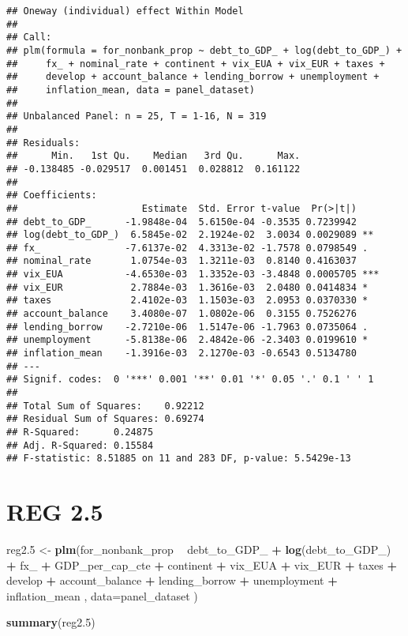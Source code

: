 \documentclass[]{article}
\newenvironment{Shaded}{\begin{snugshade}}{\end{snugshade}}
\newcommand{\KeywordTok}[1]{\textcolor[rgb]{0.13,0.29,0.53}{\textbf{#1}}}
\newcommand{\DataTypeTok}[1]{\textcolor[rgb]{0.13,0.29,0.53}{#1}}
\newcommand{\DecValTok}[1]{\textcolor[rgb]{0.00,0.00,0.81}{#1}}
\newcommand{\StringTok}[1]{\textcolor[rgb]{0.31,0.60,0.02}{#1}}
\newcommand{\OperatorTok}[1]{\textcolor[rgb]{0.81,0.36,0.00}{\textbf{#1}}}
\newcommand{\NormalTok}[1]{#1}
\begin{document}
\begin{verbatim}
## Oneway (individual) effect Within Model
## 
## Call:
## plm(formula = for_nonbank_prop ~ debt_to_GDP_ + log(debt_to_GDP_) + 
##     fx_ + nominal_rate + continent + vix_EUA + vix_EUR + taxes + 
##     develop + account_balance + lending_borrow + unemployment + 
##     inflation_mean, data = panel_dataset)
## 
## Unbalanced Panel: n = 25, T = 1-16, N = 319
## 
## Residuals:
##      Min.   1st Qu.    Median   3rd Qu.      Max. 
## -0.138485 -0.029517  0.001451  0.028812  0.161122 
## 
## Coefficients:
##                      Estimate  Std. Error t-value  Pr(>|t|)    
## debt_to_GDP_      -1.9848e-04  5.6150e-04 -0.3535 0.7239942    
## log(debt_to_GDP_)  6.5845e-02  2.1924e-02  3.0034 0.0029089 ** 
## fx_               -7.6137e-02  4.3313e-02 -1.7578 0.0798549 .  
## nominal_rate       1.0754e-03  1.3211e-03  0.8140 0.4163037    
## vix_EUA           -4.6530e-03  1.3352e-03 -3.4848 0.0005705 ***
## vix_EUR            2.7884e-03  1.3616e-03  2.0480 0.0414834 *  
## taxes              2.4102e-03  1.1503e-03  2.0953 0.0370330 *  
## account_balance    3.4080e-07  1.0802e-06  0.3155 0.7526276    
## lending_borrow    -2.7210e-06  1.5147e-06 -1.7963 0.0735064 .  
## unemployment      -5.8138e-06  2.4842e-06 -2.3403 0.0199610 *  
## inflation_mean    -1.3916e-03  2.1270e-03 -0.6543 0.5134780    
## ---
## Signif. codes:  0 '***' 0.001 '**' 0.01 '*' 0.05 '.' 0.1 ' ' 1
## 
## Total Sum of Squares:    0.92212
## Residual Sum of Squares: 0.69274
## R-Squared:      0.24875
## Adj. R-Squared: 0.15584
## F-statistic: 8.51885 on 11 and 283 DF, p-value: 5.5429e-13
\end{verbatim}

\section{REG 2.5}\label{reg-2.5}

\begin{Shaded}
\begin{Highlighting}[]
\NormalTok{reg2.}\DecValTok{5}\NormalTok{ <-}\StringTok{ }\KeywordTok{plm}\NormalTok{(for_nonbank_prop }\OperatorTok{~}\StringTok{  }\NormalTok{debt_to_GDP_ }\OperatorTok{+}\StringTok{ }\KeywordTok{log}\NormalTok{(debt_to_GDP_) }\OperatorTok{+}\StringTok{ }\NormalTok{fx_ }\OperatorTok{+}\StringTok{ }\NormalTok{GDP_per_cap_cte }\OperatorTok{+}\StringTok{   }\NormalTok{continent }\OperatorTok{+}\StringTok{ }\NormalTok{vix_EUA }\OperatorTok{+}\StringTok{ }\NormalTok{vix_EUR }\OperatorTok{+}\StringTok{ }\NormalTok{taxes }\OperatorTok{+}\StringTok{ }\NormalTok{develop }\OperatorTok{+}\StringTok{ }\NormalTok{account_balance }\OperatorTok{+}\StringTok{ }\NormalTok{lending_borrow }\OperatorTok{+}\StringTok{ }\NormalTok{unemployment }\OperatorTok{+}\StringTok{ }\NormalTok{inflation_mean , }\DataTypeTok{data=}\NormalTok{panel_dataset  )}

\KeywordTok{summary}\NormalTok{(reg2.}\DecValTok{5}\NormalTok{)}
\end{Highlighting}
\end{Shaded}
\end{document}
